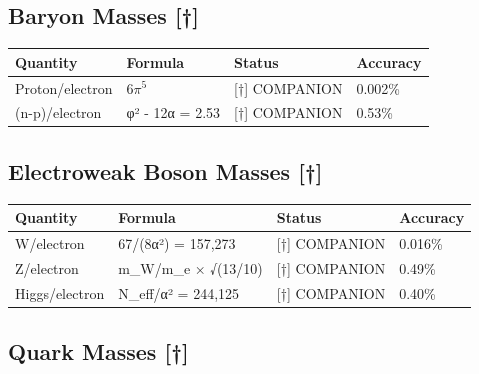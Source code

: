 \documentclass[
  11pt,
  letterpaper,
  twoside,
  openright]{book}
\begin{document}
\subsection{Baryon Masses {[}†{]}}\label{baryon-masses-1}

\begin{longtable}[]{@{}llll@{}}
\toprule\noalign{}
Quantity & Formula & Status & Accuracy \\
\midrule\noalign{}
\endhead
\bottomrule\noalign{}
\endlastfoot
Proton/electron & \(6\pi^5\) & {[}†{]} COMPANION & 0.002\% \\
(n-p)/electron & φ² - 12α = 2.53 & {[}†{]} COMPANION & 0.53\% \\
\end{longtable}

\subsection{Electroweak Boson Masses
{[}†{]}}\label{electroweak-boson-masses}

\begin{longtable}[]{@{}llll@{}}
\toprule\noalign{}
Quantity & Formula & Status & Accuracy \\
\midrule\noalign{}
\endhead
\bottomrule\noalign{}
\endlastfoot
W/electron & 67/(8α²) = 157,273 & {[}†{]} COMPANION & 0.016\% \\
Z/electron & m\_W/m\_e × √(13/10) & {[}†{]} COMPANION & 0.49\% \\
Higgs/electron & N\_eff/α² = 244,125 & {[}†{]} COMPANION & 0.40\% \\
\end{longtable}

\subsection{Quark Masses {[}†{]}}\label{quark-masses}
\end{document}
